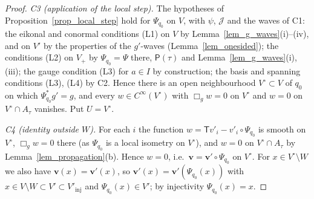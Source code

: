 \documentclass[11pt,a4paper,reqno]{amsart}
\theoremstyle{definition}
\numberwithin{equation}{section}
\newcommand{\cJ}{\mathcal{J}}
\newcommand{\sT}{\mathsf{T}}
\newcommand{\sP}{\mathsf{P}}
\begin{document}
\begin{proof}
\emph{C3 (application of the local step).} The hypotheses of Proposition~\ref{prop_local_step} hold for $\Psi_{q_0}$ on $V$,
with $\psi$, $\cJ$ and the waves of C1: the eikonal and conormal conditions \textup{(L1)} on $V$ by
Lemma~\ref{lem_g_waves}(i)--(iv), and on $V'$ by the properties of the $g'$-waves (Lemma~\ref{lem_onesided}); the
conditions \textup{(L2)} on $V_+$ by $\Psi_{q_0}=\Psi$ there, $\sP(\tau)$ and Lemma~\ref{lem_g_waves}(i),(iii); the gauge
condition \textup{(L3)} for $a\in I$ by construction; the basis and spanning conditions \textup{(L3)}, \textup{(L4)} by C2. Hence there is an open neighbourhood $V^\circ\subset V$ of $q_0$ on which $\Psi_{q_0}^*g'=g$, and every
$w\in C^\infty(V^\circ)$ with $\Box_gw=0$ on $V^\circ$ and $w=0$ on $V^\circ\cap A_\tau$ vanishes. Put $U=V^\circ$.

\emph{C4 (identity outside $W$).} For each $i$ the function $w=\sT v'_i-v'_i\circ\Psi_{q_0}$ is smooth on $V^\circ$,
$\Box_gw=0$ there (as $\Psi_{q_0}$ is a local isometry on $V^\circ$), and $w=0$ on $V^\circ\cap A_\tau$ by
Lemma~\ref{lem_propagation}(b). Hence $w=0$, i.e.\ $\mathbf v=\mathbf v'\circ\Psi_{q_0}$ on $V^\circ$. For
$x\in V^\circ\setminus W$ we also have $\mathbf v(x)=\mathbf v'(x)$, so $\mathbf v'(x)=\mathbf v'(\Psi_{q_0}(x))$ with
$x\in V\setminus W\subset V'\subset V'_{\mathrm{inj}}$ and $\Psi_{q_0}(x)\in V'$; by injectivity $\Psi_{q_0}(x)=x$.
\end{proof}
\end{document}
